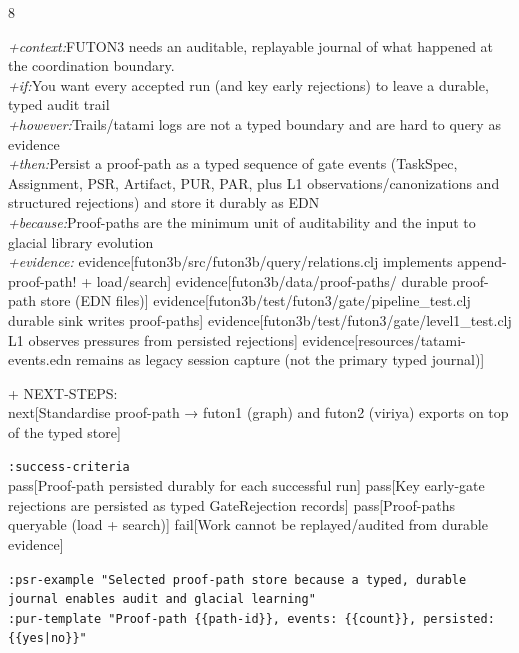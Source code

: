 \documentclass[landscape]{article}
\newcommand{\flexitag}[1]{\textcolor[gray]{0.35}{\textit{#1}}}
\newenvironment{devmapactive}{%
  \def\FrameCommand{\colorbox{devmapactivebg}}%
  \setlength{\fboxsep}{2pt}%
  \MakeFramed{\advance\hsize-\width \FrameRestore}%
}{\endMakeFramed}
\begin{document}
\begin{paracol}{8}
\begin{devmapactive}
  \flexitag{+context:}FUTON3 needs an auditable, replayable journal of what happened at the coordination boundary.\\
  \flexitag{+if:}You want every accepted run (and key early rejections) to leave a durable, typed audit trail\\
  \flexitag{+however:}Trails/tatami logs are not a typed boundary and are hard to query as evidence\\
  \flexitag{+then:}Persist a proof-path as a typed sequence of gate events (TaskSpec, Assignment, PSR, Artifact, PUR, PAR, plus L1 observations/canonizations and structured rejections) and store it durably as EDN\\
  \flexitag{+because:}Proof-paths are the minimum unit of auditability and the input to glacial library evolution\\
  \flexitag{+evidence:} evidence[futon3b/src/futon3b/query/relations.clj implements append-proof-path! + load/search] evidence[futon3b/data/proof-paths/ durable proof-path store (EDN files)] evidence[futon3b/test/futon3/gate/pipeline\_test.clj durable sink writes proof-paths] evidence[futon3b/test/futon3/gate/level1\_test.clj L1 observes pressures from persisted rejections] evidence[resources/tatami-events.edn remains as legacy session capture (not the primary typed journal)]\\
\par
  + NEXT-STEPS:\\
    next[Standardise proof-path → futon1 (graph) and futon2 (viriya) exports on top of the typed store]\\
\par
  \texttt{:\allowbreak{}success-\allowbreak{}criteria}\\
    pass[Proof-path persisted durably for each successful run] pass[Key early-gate rejections are persisted as typed GateRejection records] pass[Proof-paths queryable (load + search)] fail[Work cannot be replayed/audited from durable evidence]\\
\par
  \texttt{:\allowbreak{}psr-\allowbreak{}example "Selected proof-\allowbreak{}path store because a typed,\allowbreak{} durable journal enables audit and glacial learning"}\\
  \texttt{:\allowbreak{}pur-\allowbreak{}template "Proof-\allowbreak{}path \{\{path-\allowbreak{}id\}\},\allowbreak{} events:\allowbreak{} \{\{count\}\},\allowbreak{} persisted:\allowbreak{} \{\{yes|\allowbreak{}no\}\}"}\\
\par

\end{devmapactive}
\end{paracol}
\end{document}
